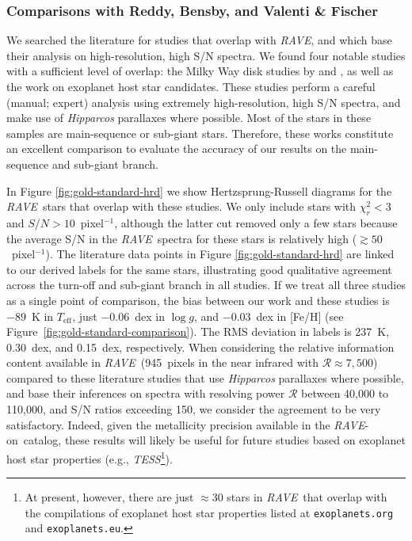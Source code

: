 \documentclass[preprint]{aastex}
\newcommand{\acronym}[1]{{\small{#1}}}
\newcommand{\project}[1]{\textsl{#1}}
\newcommand{\rave}{\project{\acronym{RAVE}}}
\newcommand{\raveon}{\rave-on}
\newcommand{\teff}{T_{\mathrm{eff}}}
\newcommand{\logg}{\log g}
\begin{document}
\subsubsection{Comparisons with Reddy, Bensby, and Valenti \& Fischer}
\label{sec:validation-gold-standards}


We searched the literature for studies that overlap with \rave, and which base
their analysis on high-resolution, high S/N spectra.  We found four notable
studies with a sufficient level of overlap: the Milky Way disk studies by 
\citet{Reddy_2003,Reddy_2006} and \citet{Bensby_2014}, as well as the 
\citet{Valenti_Fischer_2005} work on exoplanet host star candidates.  These 
studies perform a careful (manual; expert) analysis using extremely 
high-resolution, high S/N spectra, and make use of \project{Hipparcos} 
parallaxes where possible.  Most of the stars in these samples are 
main-sequence or sub-giant stars.  Therefore, these works constitute an 
excellent comparison to evaluate the accuracy of our results on the 
main-sequence and sub-giant branch.


In Figure \ref{fig:gold-standard-hrd} we show Hertzsprung-Russell diagrams 
for the \rave\ stars that overlap with these studies.  We only include stars 
with $\chi_r^2 < 3$ and $S/N > 10$~pixel$^{-1}$, although the latter cut 
removed only a few stars because the average S/N in the \rave\ spectra for
these stars is relatively high ($\gtrsim{}50$~pixel$^{-1}$).  The literature 
data points in Figure \ref{fig:gold-standard-hrd} are linked to our derived
labels for the same stars, illustrating good qualitative agreement across 
the turn-off and sub-giant branch in all studies.  If we treat all three 
studies as a single point of comparison, the bias between our work and these 
studies is $-89$~K in $\teff$, just $-0.06$~dex in $\logg$, and $-0.03$~dex 
in [Fe/H] (see Figure~\ref{fig:gold-standard-comparison}).  The RMS deviation
in labels is 237~K, 0.30~dex, and 0.15~dex, respectively.  When considering 
the relative information content available in \rave\ (945~pixels in the near 
infrared with $\mathcal{R} \approx 7{,}500$) compared to these literature 
studies that use \project{Hipparcos} parallaxes where possible, and base 
their inferences on spectra with resolving power $\mathcal{R}$ between 
40,000 to 110,000, and S/N ratios exceeding 150, we consider the agreement 
to be very satisfactory.  Indeed, given the metallicity precision available
in the \raveon\ catalog, these results will likely be useful for future 
studies based on exoplanet host star properties (e.g., 
\project{TESS}\footnote{At present, however, there are just $\approx$30 
stars in \rave\ that overlap with the compilations of exoplanet host star 
properties listed at \texttt{exoplanets.org} and \texttt{exoplanets.eu}.}).
\end{document}
